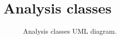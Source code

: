 \chapter{Analysis classes}\label{ch:classes}

\begin{figure}[ht]
	\caption{Analysis classes UML diagram.}
	\label{fig:classes}
\end{figure}
